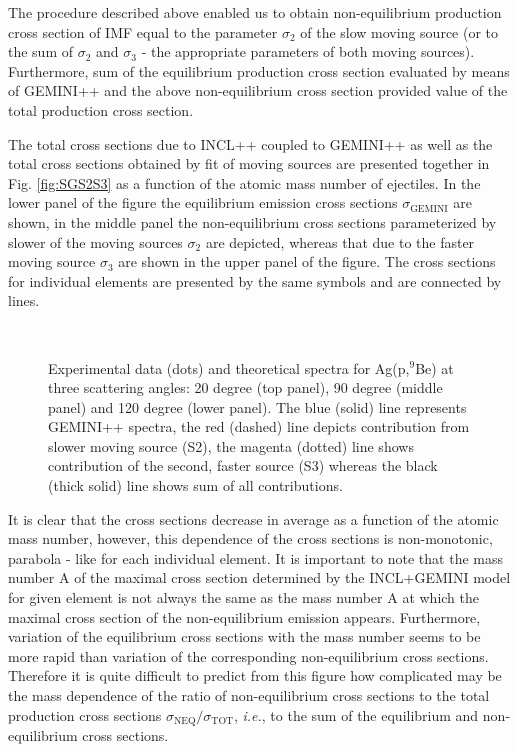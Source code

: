 The procedure described above enabled us to obtain non-equilibrium
production cross section of IMF equal to the parameter $\sigma_2$ of
the slow moving source (or to the sum of $\sigma_2$ and $\sigma_3$ -
the appropriate parameters of both moving sources).  Furthermore,
sum of the equilibrium production cross section evaluated by means
of GEMINI++ and the above non-equilibrium cross section provided
value of the total production cross section.

The total cross sections due to INCL++ \cite{Mancusi14A} coupled to
GEMINI++ \cite{GEMINI++} as well as the total cross sections
obtained by fit of moving sources are presented together in Fig.
\ref{fig:SGS2S3} as a function of the atomic mass number of
ejectiles. In the lower panel of the figure the equilibrium emission
cross sections $\sigma_{\text{GEMINI}}$ are shown, in the middle
panel the non-equilibrium cross sections parameterized by slower of
the moving sources $\sigma_2$ are depicted, whereas that due to the
faster moving source $\sigma_{3}$ are shown in the upper panel of
the figure.  The cross sections for individual elements are
presented by the same symbols and are connected by lines.





\begin{figure}
  \centering
  \\
  \caption{Experimental data (dots) and theoretical spectra for Ag(p,$^9$Be) at three
  scattering angles: 20 degree (top panel), 90 degree (middle panel) and 120 degree (lower panel).
  The blue (solid) line represents GEMINI++ spectra, the red (dashed) line depicts contribution
  from slower moving source (S2), the magenta (dotted) line shows contribution of the second, faster
  source (S3) whereas the black (thick solid) line shows sum of all contributions.}
  \label{fig:9BeGEMINIS2S3}
\end{figure}


It is clear that the cross sections decrease in average as a
function of the atomic mass number, however, this dependence of the
cross sections is non-monotonic, parabola - like  for each
individual element. It is important to note that the mass number A
of the maximal cross section  determined by the INCL+GEMINI model
for given element is not always the same as the mass number A at
which the maximal cross section of the non-equilibrium emission
appears. Furthermore, variation of the equilibrium cross sections
with the mass number seems to be more rapid than variation of the
corresponding non-equilibrium cross sections. Therefore it is quite
difficult to predict from this figure how complicated may be the
mass dependence of the ratio of non-equilibrium cross sections to
the total production cross sections
$\sigma_{\text{NEQ}}/\sigma_{\text{TOT}}$, \emph{i.e.}, to the sum
of the equilibrium and non-equilibrium cross sections.



